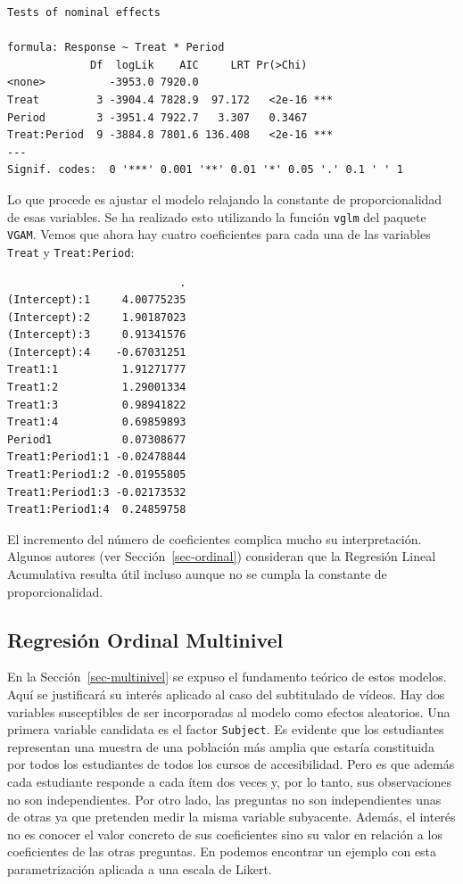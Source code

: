 \documentclass[
  12pt,
  a4paper,
  extrafontsizes,
  onecolumn,
  openright,
  table]{memoir}
\begin{document}
\scriptsize

\begin{verbatim}
Tests of nominal effects

formula: Response ~ Treat * Period
             Df  logLik    AIC     LRT Pr(>Chi)    
<none>          -3953.0 7920.0                     
Treat         3 -3904.4 7828.9  97.172   <2e-16 ***
Period        3 -3951.4 7922.7   3.307   0.3467    
Treat:Period  9 -3884.8 7801.6 136.408   <2e-16 ***
---
Signif. codes:  0 '***' 0.001 '**' 0.01 '*' 0.05 '.' 0.1 ' ' 1
\end{verbatim}

\normalsize

Lo que procede es ajustar el modelo relajando la constante de
proporcionalidad de esas variables. Se ha realizado esto utilizando la
función \texttt{vglm} del paquete \texttt{VGAM}. Vemos que ahora hay
cuatro coeficientes para cada una de las variables \texttt{Treat} y
\texttt{Treat:Period}:

\scriptsize

\begin{verbatim}
                           .
(Intercept):1     4.00775235
(Intercept):2     1.90187023
(Intercept):3     0.91341576
(Intercept):4    -0.67031251
Treat1:1          1.91271777
Treat1:2          1.29001334
Treat1:3          0.98941822
Treat1:4          0.69859893
Period1           0.07308677
Treat1:Period1:1 -0.02478844
Treat1:Period1:2 -0.01955805
Treat1:Period1:3 -0.02173532
Treat1:Period1:4  0.24859758
\end{verbatim}

\normalsize

El incremento del número de coeficientes complica mucho su
interpretación. Algunos autores (ver Sección~\ref{sec-ordinal})
consideran que la Regresión Lineal Acumulativa resulta útil incluso
aunque no se cumpla la constante de proporcionalidad.

\hypertarget{sec-multinivel-2}{%
\subsection{Regresión Ordinal Multinivel}\label{sec-multinivel-2}}

En la Sección~\ref{sec-multinivel} se expuso el fundamento teórico de
estos modelos. Aquí se justificará su interés aplicado al caso del
subtitulado de vídeos. Hay dos variables susceptibles de ser
incorporadas al modelo como efectos aleatorios. Una primera variable
candidata es el factor \texttt{Subject}. Es evidente que los estudiantes
representan una muestra de una población más amplia que estaría
constituida por todos los estudiantes de todos los cursos de
accesibilidad. Pero es que además cada estudiante responde a cada ítem
dos veces y, por lo tanto, sus observaciones no son independientes. Por
otro lado, las preguntas no son independientes unas de otras ya que
pretenden medir la misma variable subyacente. Además, el interés no es
conocer el valor concreto de sus coeficientes sino su valor en relación
a los coeficientes de las otras preguntas. En
\textcite[pp.~14-16]{burkner2021} \textcite[pp.~19-20]{burkner2019}
podemos encontrar un ejemplo con esta parametrización aplicada a una
escala de Likert.
\end{document}
